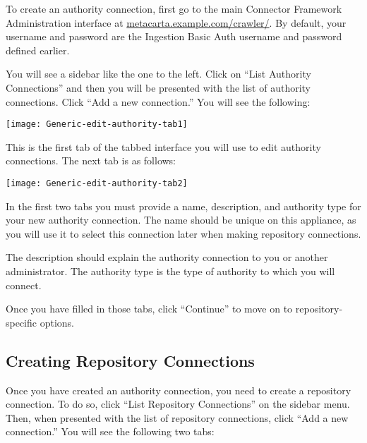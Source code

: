 \begin{changemargin}{1.5in}{0in}
To create an authority connection, first go to the
main Connector Framework Administration interface at
\url{metacarta.example.com/crawler/}.  By default, your username and
password are the Ingestion Basic Auth username and password defined
earlier. 

You will see a sidebar like the one to the left. Click on ``List
Authority Connections'' and then you will be presented with the
list of authority connections. Click ``Add a new connection.''
You will see the following:

\texttt{[image: Generic-edit-authority-tab1]}

This is the first tab of the tabbed interface you will use to edit
authority connections. The next tab is as follows:

\texttt{[image: Generic-edit-authority-tab2]}



In the first two tabs you must provide a name, description, and authority
type for your new authority connection. The name should be unique on
this appliance, as you will use it to select this connection later when
making repository connections.


The description should explain the authority connection to you or another
administrator. The authority type is the type of authority to which you
will connect.

Once you have filled in those tabs, click ``Continue'' to move on to
repository-specific options.





\subsection{Creating Repository Connections}

Once you have created an authority connection, you need to create a
repository connection.
To do so, click ``List Repository Connections'' on the sidebar menu. Then,
when presented with the list of repository connections, click ``Add a
new connection.'' You will see the following two tabs:


\end{changemargin}
